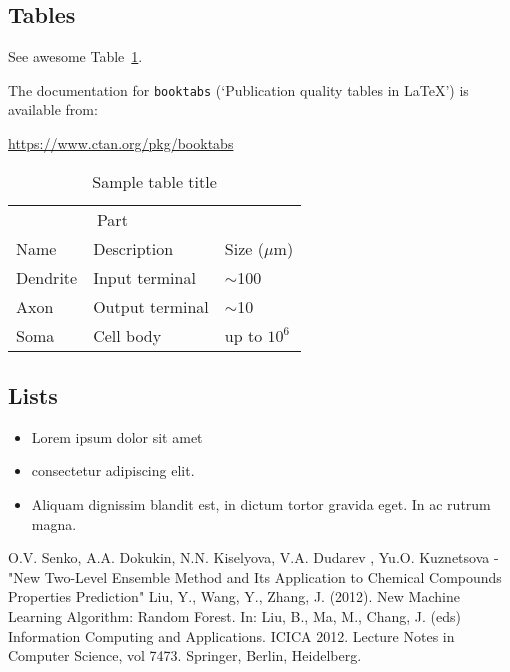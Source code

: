 \documentclass{article}
\begin{document}
\subsection{Tables}
See awesome Table~\ref{tab:table}.

The documentation for \verb+booktabs+ (`Publication quality tables in LaTeX') is available from:
\begin{center}
	\url{https://www.ctan.org/pkg/booktabs}
\end{center}


\begin{table}
	\caption{Sample table title}
	\centering
	\begin{tabular}{lll}
		\toprule
		\multicolumn{2}{c}{Part}                   \\
		\cmidrule(r){1-2}
		Name     & Description     & Size ($\mu$m) \\
		\midrule
		Dendrite & Input terminal  & $\sim$100     \\
		Axon     & Output terminal & $\sim$10      \\
		Soma     & Cell body       & up to $10^6$  \\
		\bottomrule
	\end{tabular}
	\label{tab:table}
\end{table}

\subsection{Lists}
\begin{itemize}
	\item Lorem ipsum dolor sit amet
	\item consectetur adipiscing elit.
	\item Aliquam dignissim blandit est, in dictum tortor gravida eget. In ac rutrum magna.
\end{itemize}


\newpage



\begin{thebibliography}{}
	 O.V. Senko, A.A. Dokukin, N.N. Kiselyova, V.A. Dudarev
	, Yu.O. Kuznetsova - "New Two-Level Ensemble Method and Its Application to
	Chemical Compounds Properties Prediction"
	 Liu, Y., Wang, Y., Zhang, J. (2012). New Machine Learning Algorithm: Random Forest. In: Liu, B., Ma, M., Chang, J. (eds) Information Computing and Applications. ICICA 2012. Lecture Notes in Computer Science, vol 7473. Springer, Berlin, Heidelberg.
\end{thebibliography}
\end{document}
